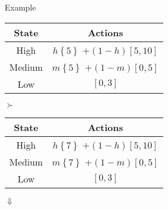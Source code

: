\documentclass[usenames,dvipsnames,aspectratio=169,11pt, envcountsect]{beamer}
\begin{document}
\begin{frame}{Example}
	\begin{table}[H]
		\centering
		\begin{minipage}{0.45\textwidth}
			\centering
			\begin{tabular}{c | c}
				State                          & Actions                                                                                       \\
				\hline
				{\color{bleudefrance} High}    & {\color{bleudefrance}\( h \left\{ 5 \right\} \) } \(+ \left(1-h \right) \left[5,10 \right] \) \\
				{\color{bleudefrance} Medium } & {\color{bleudefrance}\( m \left\{ 5 \right\} \) } \(+ \left(1-m \right) \left[0,5 \right] \)  \\
				Low                            & \( \left[0,3 \right] \)                                                                       \\
			\end{tabular}
		\end{minipage}\hspace{0.25cm} %
		\( \succ \) %
		\hspace{0.25cm}
		\begin{minipage}{0.45\textwidth}
			\centering
			\begin{tabular}{c | c}
				State                          & Actions                                                                                       \\
				\hline
				{\color{bleudefrance} High}    & {\color{bleudefrance}\( h \left\{ 7 \right\} \) } \(+ \left(1-h \right) \left[5,10 \right] \) \\
				{\color{bleudefrance} Medium } & {\color{bleudefrance}\( m \left\{ 7 \right\} \) } \(+ \left(1-m \right) \left[0,5 \right] \)  \\
				Low                            & \( \left[0,3 \right] \)                                                                       \\
			\end{tabular}
		\end{minipage}
	\end{table} \pause

	\begin{center}
		\( \Downarrow \)
	\end{center}


\end{frame}
\end{document}
